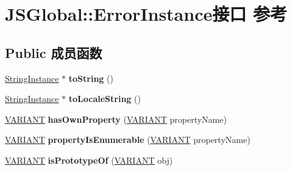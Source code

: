 \hypertarget{interface_j_s_global_1_1_error_instance}{}\section{J\+S\+Global\+:\+:Error\+Instance接口 参考}
\label{interface_j_s_global_1_1_error_instance}
\subsection*{Public 成员函数}
\begin{DoxyCompactItemize}
\item 
\mbox{\label{interface_j_s_global_1_1_error_instance_aa5e985685dd01044099b53a25f5dd915}} 
\hyperlink{interface_j_s_global_1_1_string_instance}{String\+Instance} $\ast$ {\bfseries to\+String} ()
\item 
\mbox{\label{interface_j_s_global_1_1_error_instance_a73b74b88e27010c4868046e784ac7fdd}} 
\hyperlink{interface_j_s_global_1_1_string_instance}{String\+Instance} $\ast$ {\bfseries to\+Locale\+String} ()
\item 
\mbox{\label{interface_j_s_global_1_1_error_instance_a49adcbb82053c1b1a59ec5320b707219}} 
\hyperlink{structtag_v_a_r_i_a_n_t}{V\+A\+R\+I\+A\+NT} {\bfseries has\+Own\+Property} (\hyperlink{structtag_v_a_r_i_a_n_t}{V\+A\+R\+I\+A\+NT} property\+Name)
\item 
\mbox{\label{interface_j_s_global_1_1_error_instance_acfe6a9dcafa0dcc82aeafa341538d511}} 
\hyperlink{structtag_v_a_r_i_a_n_t}{V\+A\+R\+I\+A\+NT} {\bfseries property\+Is\+Enumerable} (\hyperlink{structtag_v_a_r_i_a_n_t}{V\+A\+R\+I\+A\+NT} property\+Name)
\item 
\mbox{\label{interface_j_s_global_1_1_error_instance_a9528b3e3e191ff9810a5487181805cef}} 
\hyperlink{structtag_v_a_r_i_a_n_t}{V\+A\+R\+I\+A\+NT} {\bfseries is\+Prototype\+Of} (\hyperlink{structtag_v_a_r_i_a_n_t}{V\+A\+R\+I\+A\+NT} obj)
\end{DoxyCompactItemize}
